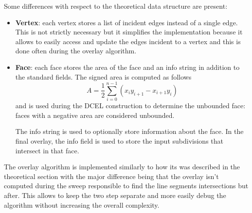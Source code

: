 Some differences with respect to the theoretical data structure are present:
\begin{itemize}
    \item \textbf{Vertex}: each vertex stores a list of incident edges instead of a single edge. This is not strictly necessary but it simplifies the implementation because it allows to easily access and update the edges incident to a vertex and this is done often during the overlay algorithm.
    \item \textbf{Face}: each face stores the area of the face and an info string in addition to the standard fields. The signed area is computed as follows
          \begin{equation*}
              A = \frac{1}{2} \sum_{i=0}^{n-1} (x_i y_{i+1} - x_{i+1} y_i)
          \end{equation*}
          and is used during the DCEL construction to determine the unbounded face: faces with a negative area are considered unbounded.

          The info string is used to optionally store information about the face. In the final overlay, the info field is used to store the input subdivisions that intersect in that face.
\end{itemize}

The overlay algorithm is implemented similarly to how its was described in the theoretical section with the major difference being that the overlay isn't computed during the sweep responsible to find the line segments intersections but after. This allows to keep the two step separate and more easily debug the algorithm without increasing the overall complexity.


